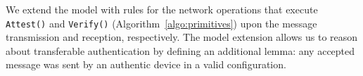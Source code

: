 We extend the model with rules for the network operations that execute \texttt{Attest()} and \texttt{Verify()} (Algorithm~\ref{algo:primitives}) upon the message transmission and reception, respectively. The model extension allows us to reason about transferable authentication by defining an additional lemma: any accepted message was sent by an authentic \projecttitle{} device in a valid configuration.
\fi
{}

\endgroup



